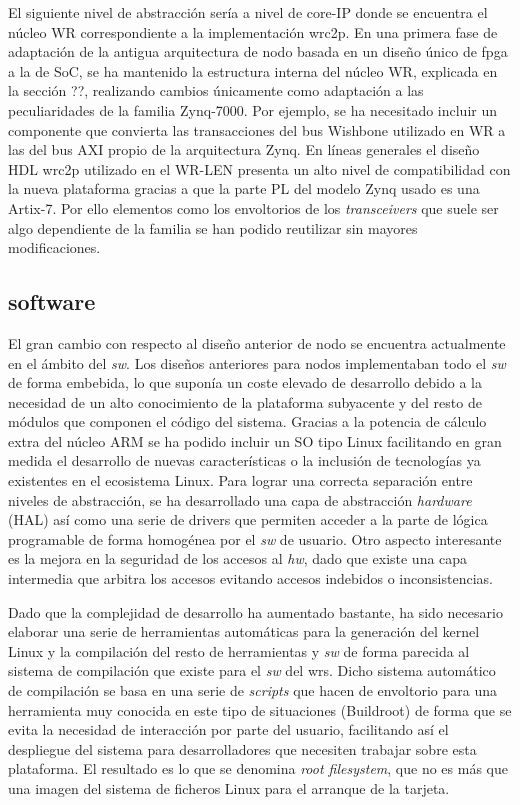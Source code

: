 El siguiente nivel de abstracción sería a nivel de core-IP donde se encuentra 
el núcleo WR correspondiente a la implementación \gls{wrc2p}. En una primera 
fase de adaptación de la antigua arquitectura de nodo basada en un diseño único 
de \gls{fpga} a la de SoC, se ha mantenido la estructura interna del núcleo WR, 
explicada en la sección ??, realizando cambios únicamente como adaptación a las 
peculiaridades de la familia Zynq-7000. Por ejemplo, se ha necesitado incluir 
un componente que convierta las transacciones del bus Wishbone utilizado en WR 
a las del bus AXI propio de la arquitectura Zynq. En líneas generales el diseño 
HDL \gls{wrc2p} utilizado en el WR-LEN presenta un alto nivel de compatibilidad 
con la nueva plataforma gracias a que la parte PL del modelo Zynq usado es una 
Artix-7. Por ello elementos como los envoltorios de los \textit{transceivers} 
que suele ser algo dependiente de la familia se han podido reutilizar sin 
mayores modificaciones.

\subsection{software}

El gran cambio con respecto al diseño anterior de nodo se encuentra actualmente 
en el ámbito del \textit{sw}. Los diseños anteriores para nodos implementaban 
todo el \textit{sw} de forma embebida, lo que suponía un coste elevado de 
desarrollo debido a la necesidad de un alto conocimiento de la plataforma 
subyacente y del resto de módulos que componen el código del sistema. Gracias a 
la potencia de cálculo extra del núcleo ARM se ha podido incluir un SO tipo 
Linux facilitando en gran medida el desarrollo de nuevas características o la 
inclusión de tecnologías ya existentes en el ecosistema Linux. Para lograr una 
correcta separación entre niveles de abstracción, se ha desarrollado una capa 
de abstracción \textit{hardware} (HAL) así como una serie de drivers que 
permiten acceder a la parte de lógica programable de forma homogénea por el 
\textit{sw} de usuario. Otro aspecto interesante es la mejora en la seguridad 
de los accesos al \textit{hw}, dado que existe una capa intermedia que arbitra 
los accesos evitando accesos indebidos o inconsistencias.

Dado que la complejidad de desarrollo ha aumentado bastante, ha sido necesario 
elaborar una serie de herramientas automáticas para la generación del kernel 
Linux y la compilación del resto de herramientas y \textit{sw} de forma 
parecida al sistema de compilación que existe para el \textit{sw} del 
\gls{wrs}. Dicho sistema automático de compilación se basa en una serie de 
\textit{scripts} que hacen de envoltorio para una herramienta muy conocida en 
este tipo de situaciones (Buildroot) de forma que se evita la necesidad de 
interacción por parte del usuario, facilitando así el despliegue del sistema 
para desarrolladores que necesiten trabajar sobre esta plataforma. El resultado 
es lo que se denomina \textit{root filesystem}, que no es más que una imagen 
del sistema de ficheros Linux para el arranque de la tarjeta.

